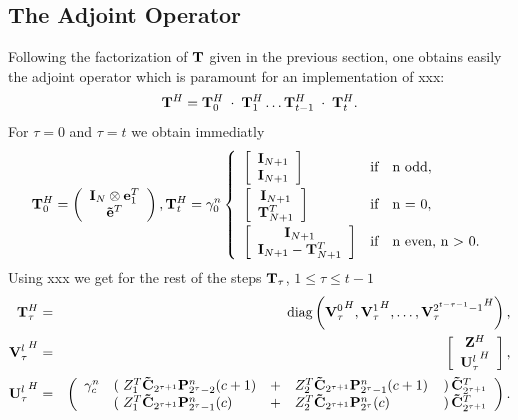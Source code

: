 \subsection{The Adjoint Operator}
Following the factorization of $\mathbf{T}$ given in the previous section, one obtains easily the adjoint operator which is paramount for an implementation of xxx: 
$$\mathbf{T}^H = \mathbf{T}_{0}^H \; \cdot \; \mathbf{T}_{1}^H \dots \mathbf{T}_{t-1}^H \; \cdot \; \mathbf{T}_{t}^H.$$ For $\tau = 0$ and $\tau = t$ we obtain immediatly
$$ \mb{T}_{0}^H = \left( \begin{array}{c} \mb{I}_{N} \otimes \mb{e}_{1}^T\\ \mb{\tilde{e}}^T \end{array}\right), \mb{T}_{t}^H = \gamma_{0}^n \left\{\begin{array}{l@{\quad \text{if} \quad}l} 
 \left[ \begin{array}{c} \mb{I}_{N+1} \\ \mb{I}_{N+1} \end{array} \right] & \text{n odd},\\[2ex]
 \left[ \begin{array}{c} \mb{I}_{N+1} \\ \mb{T}_{N+1}^T \end{array} \right] & \text{n = 0},\\[2ex]
 \left[ \begin{array}{c} \mb{I}_{N+1} \\ \mb{I}_{N+1} - \mb{T}_{N+1}^T \end{array} \right] & \text{n even, n > 0}.
\end{array}\right.$$
Using xxx we get for the rest of the steps $\mathbf{T}_{\tau}$, $1 \le \tau \le t-1$
\begin{eqnarray*}
 \mathbf{T}_{\tau}^H & = & \text{diag}\left({\mathbf{V}_{\tau}^0}^H,{\mathbf{V}_{\tau}^1}^H,\dots,{\mathbf{V}_{\tau}^{2^{t-\tau-1}-1}}^H\right),\\
 {\mathbf{V}_{\tau}^l}^H & = & \left[ \begin{array}{c} \mathbf{Z}^H \\ { \mathbf{U}_{\tau}^l}^H \end{array} \right],\\
 {\mathbf{U}_{\tau}^l}^H & = &
   \left(
     \begin{array}{rlllr}
        \gamma_{c}^n & \left(\right. Z_{1}^T \mathbf{\tilde{C}}_{2^{\tau+1}} \mathbf{P}_{2^{\tau}-2}^n(c+1)   & + & Z_{2}^T \mathbf{\tilde{C}}_{2^{\tau+1}} \mathbf{P}_{2^{\tau}-1}^n(c+1)
         & \left.\right) \mathbf{\tilde{C}}_{2^{\tau+1}}^T \\
        & \left(\right. Z_{1}^T \mathbf{\tilde{C}}_{2^{\tau+1}} \mathbf{P}_{2^{\tau}-1}^n(c) & + & Z_{2}^T \mathbf{\tilde{C}}_{2^{\tau+1}} \mathbf{P}_{2^{\tau}}^n(c) & \left.\right) \mathbf{\tilde{C}}_{2^{\tau+1}}^T
     \end{array}
   \right).
\end{eqnarray*}


